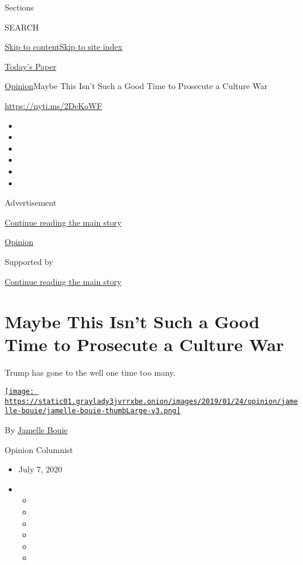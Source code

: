 Sections

SEARCH

\protect\hyperlink{site-content}{Skip to
content}\protect\hyperlink{site-index}{Skip to site index}

\href{https://myaccount.nytimes3xbfgragh.onion/auth/login?response_type=cookie\&client_id=vi}{}

\href{https://www.nytimes3xbfgragh.onion/section/todayspaper}{Today's
Paper}

\href{/section/opinion}{Opinion}\textbar{}Maybe This Isn't Such a Good
Time to Prosecute a Culture War

\url{https://nyti.ms/2DeKoWF}

\begin{itemize}
\item
\item
\item
\item
\item
\item
\end{itemize}

Advertisement

\protect\hyperlink{after-top}{Continue reading the main story}

\href{/section/opinion}{Opinion}

Supported by

\protect\hyperlink{after-sponsor}{Continue reading the main story}

\hypertarget{maybe-this-isnt-such-a-good-time-to-prosecute-a-culture-war}{%
\section{Maybe This Isn't Such a Good Time to Prosecute a Culture
War}\label{maybe-this-isnt-such-a-good-time-to-prosecute-a-culture-war}}

Trump has gone to the well one time too many.

\href{https://www.nytimes3xbfgragh.onion/column/jamelle-bouie}{\texttt{[image: https://static01.graylady3jvrrxbe.onion/images/2019/01/24/opinion/jamelle-bouie/jamelle-bouie-thumbLarge-v3.png]}}

By
\href{https://www.nytimes3xbfgragh.onion/column/jamelle-bouie}{Jamelle
Bouie}

Opinion Columnist

\begin{itemize}
\item
  July 7, 2020
\item
  \begin{itemize}
  \item
  \item
  \item
  \item
  \item
  \item
  \end{itemize}
\end{itemize}

